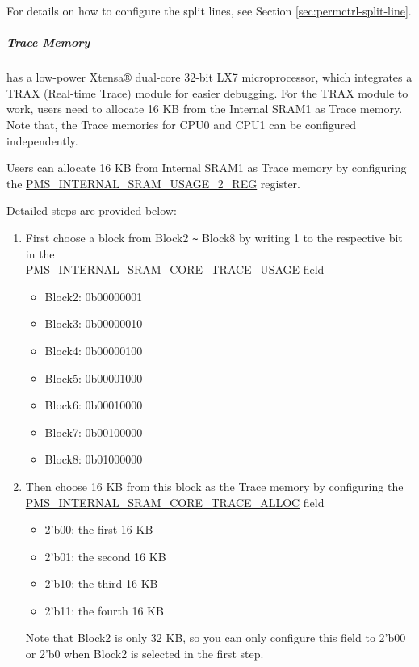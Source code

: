 \documentclass[main\_\_EN.tex]{subfiles}
\begin{document}
For details on how to configure the split lines, see Section \ref{sec:permctrl-split-line}.

\subparagraph{Trace Memory} \label{sec:permctrl_trace}
\chipname{} has a low-power Xtensa® dual-core 32-bit LX7 microprocessor, which integrates a TRAX (Real-time Trace) module for easier debugging. For the TRAX module to work, users need to allocate 16 KB from the Internal SRAM1 as Trace memory. Note that, the Trace memories for CPU0 and CPU1 can be configured independently.

Users can allocate 16 KB from Internal SRAM1 as Trace memory by configuring the  \hyperref[regdesc:PMSINTERNALSRAMUSAGE2REG]{PMS\_INTERNAL\_SRAM\_USAGE\_2\_REG} register.

Detailed steps are provided below:

\begin{enumerate}
    \item First choose a block from Block2 \verb+~+ Block8 by writing 1 to the respective bit in the \\ \hyperref[fielddesc:PMSINTERNALSRAMCORE0TRACEUSAGE]{PMS\_INTERNAL\_SRAM\_CORE\_TRACE\_USAGE} field
    \begin{itemize}
        \item Block2: 0b00000001
        \item Block3: 0b00000010
        \item Block4: 0b00000100
        \item Block5: 0b00001000
        \item Block6: 0b00010000
        \item Block7: 0b00100000
        \item Block8: 0b01000000
    \end{itemize}
    \item Then choose 16 KB from this block as the Trace memory by configuring the \\ \hyperref[fielddesc:PMSINTERNALSRAMCORE0TRACEALLOC]{PMS\_INTERNAL\_SRAM\_CORE\_TRACE\_ALLOC} field
    \begin{itemize}
        \item 2'b00: the first 16 KB
        \item 2'b01: the second 16 KB
        \item 2'b10: the third 16 KB
        \item 2'b11: the fourth 16 KB
    \end{itemize}
    Note that Block2 is only 32 KB, so you can only configure this field to 2'b00 or 2'b0 when Block2 is selected in the first step.
\end{enumerate}
\end{document}
